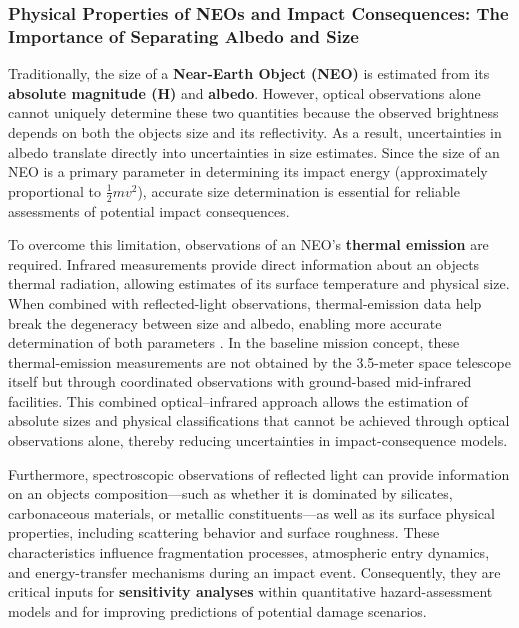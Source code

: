 \subsubsection{Physical Properties of NEOs and Impact Consequences: The Importance of Separating Albedo and Size}

Traditionally, the size of a \textbf{Near-Earth Object (NEO)} is estimated from its \textbf{absolute magnitude (H)} and \textbf{albedo}. However, optical observations alone cannot uniquely determine these two quantities because the observed brightness depends on both the object\textquotesingle s size and its reflectivity. As a result, uncertainties in albedo translate directly into uncertainties in size estimates. Since the size of an NEO is a primary parameter in determining its impact energy (approximately proportional to \textbf{$\frac{1}{2}mv^2$}), accurate size determination is essential for reliable assessments of potential impact consequences.

To overcome this limitation, observations of an NEO's \textbf{thermal emission} are required. Infrared measurements provide direct information about an object\textquotesingle s thermal radiation, allowing estimates of its surface temperature and physical size. When combined with reflected-light observations, thermal-emission data help break the degeneracy between size and albedo, enabling more accurate determination of both parameters \cite{mainzer2011}. 
In the baseline mission concept, these thermal-emission measurements are not obtained by the 3.5-meter space telescope itself but through coordinated observations with ground-based mid-infrared facilities.
This combined optical--infrared approach allows the estimation of absolute sizes and physical classifications that cannot be achieved through optical observations alone, thereby reducing uncertainties in impact-consequence models.

Furthermore, spectroscopic observations of reflected light can provide information on an object\textquotesingle s composition---such as whether it is dominated by silicates, carbonaceous materials, or metallic constituents---as well as its surface physical properties, including scattering behavior and surface roughness. These characteristics influence fragmentation processes, atmospheric entry dynamics, and energy-transfer mechanisms during an impact event. Consequently, they are critical inputs for \textbf{sensitivity analyses} within quantitative hazard-assessment models and for improving predictions of potential damage scenarios.

